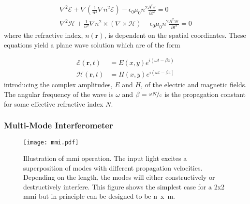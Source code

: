 \begin{align}
	\nabla^2\mathcal{E} + \nabla\left(\frac{1}{n^2}\nabla n^2\mathcal{E}\right) - \epsilon_0\mu_0 n^2 \frac{\partial^2\mathcal{E}}{\partial t^2} = 0\\
	\nabla^2\mathcal{H} + \frac{1}{n^2}\nabla n^2\times\left(\nabla\times\mathcal{H}\right) - \epsilon_0\mu_0 n^2 \frac{\partial^2\mathcal{H}}{\partial t^2} = 0
\end{align}
where the refractive index, $n(\mathbf{r})$, is dependent on the spatial coordinates. These equations yield a plane wave solution which are of the form

\begin{align}
	\mathcal{E}(\mathbf{r}, t) &= E(x,y)e^{i(\omega t - \beta z)}\\
	\mathcal{H}(\mathbf{r}, t) &= H(x,y)e^{i(\omega t - \beta z)}
\end{align}
introducing the complex amplitudes, $E$ and $H$, of the electric and magnetic fields. The angular frequency  of the wave is $\omega$ and $\beta = \nicefrac{\omega N}{c}$ is the propagation constant for some effective refractive index $N$.






%
%
%
%
%
%

\subsubsection*{Multi-Mode Interferometer}

\begin{figure}[t]
	\centering
	\texttt{[image: mmi.pdf]}
	\caption[Multi-mode interferometer operating principle]{Illustration of \acs{mmi} operation. The input light excites a superposition of modes with different propagation velocities. Depending on the length, the modes will either constructively or destructively interfere. This figure shows the simplest case for a \si{2x2} \acs{mmi} but in principle can be designed to be \si{n x m}.}
	\label{fig:mmi}
\end{figure}

